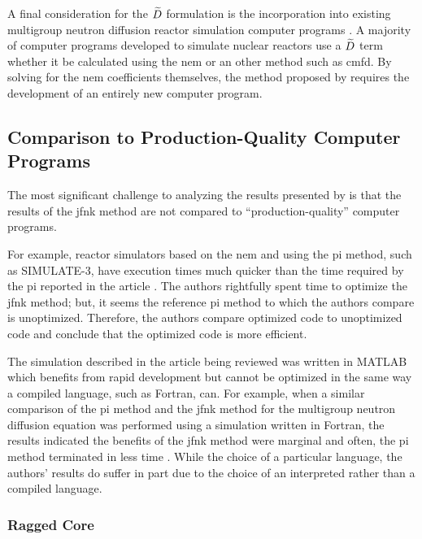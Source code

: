     A final consideration for the $\widetilde{D}$ formulation is the incorporation
    into existing multigroup neutron diffusion reactor simulation computer
    programs \cite{casmo4,simulate3,mpact}. A majority of computer programs
    developed to simulate nuclear reactors use a $\widetilde{D}$ term whether it be
    calculated using the \gls{nem} or an other method such as \gls{cmfd}. By
    solving for the \gls{nem} coefficients themselves, the method proposed by
    \citeauthor{qe2paper} requires the development of an entirely new computer
    program.

  \subsection{Comparison to Production-Quality Computer Programs}

    The most significant challenge to analyzing the results presented by
    \citeauthor{qe2paper} is that the results of the \gls{jfnk} method are not
    compared to ``production-quality'' computer programs. 
    
    For example, reactor simulators based on the \gls{nem} and using the
    \gls{pi} method, such as SIMULATE-3, have execution times much quicker than
    the time required by the \gls{pi} reported in the article
    \cite{simulate3,qe2paper}. The authors rightfully spent time to optimize the
    \gls{jfnk} method; but, it seems the reference \gls{pi} method to which the
    authors compare is unoptimized. Therefore, the authors compare optimized
    code to unoptimized code and conclude that the optimized code is more
    efficient.
    
    The simulation described in the article being reviewed was written in MATLAB
    which benefits from rapid development but cannot be optimized in the same
    way a compiled language, such as Fortran, can. For example, when a similar
    comparison of the \gls{pi} method and the \gls{jfnk} method for the
    multigroup neutron diffusion equation was performed using a simulation
    written in Fortran, the results indicated the benefits of the \gls{jfnk}
    method were marginal and often, the \gls{pi} method terminated in less time
    \cite{gill_azmy}. While the choice of a particular language, the authors'
    results do suffer in part due to the choice of an interpreted rather than a
    compiled language.

    \subsubsection{Ragged Core}

